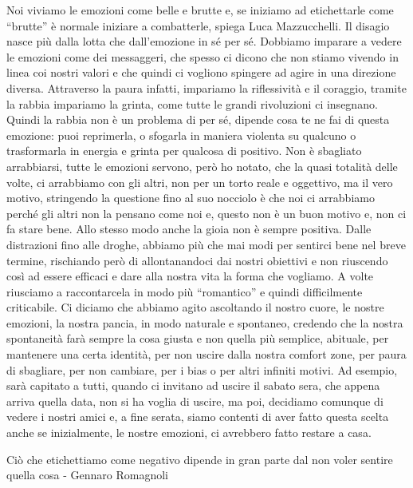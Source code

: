 \documentclass[12pt]{book} %
\begin{document}
Noi viviamo le emozioni come belle e brutte e, se iniziamo ad etichettarle come “brutte” è normale iniziare a
combatterle, spiega Luca Mazzucchelli. Il disagio nasce più dalla lotta che dall'emozione in sé
per sé. Dobbiamo imparare a vedere le emozioni come dei messaggeri, che spesso ci dicono che non stiamo vivendo in
linea coi nostri valori e che quindi ci vogliono spingere ad agire in una direzione diversa. Attraverso la paura
infatti, impariamo la riflessività e il coraggio, tramite la rabbia impariamo la grinta, come tutte le grandi
rivoluzioni ci insegnano. Quindi la rabbia non è un problema di per sé, dipende cosa te ne fai di questa emozione: puoi
reprimerla, o sfogarla in maniera violenta su qualcuno o trasformarla in energia e grinta per qualcosa di positivo.
Non è sbagliato arrabbiarsi, tutte le emozioni servono, però ho notato, che la quasi totalità delle volte, ci arrabbiamo con gli altri, non per un torto reale e oggettivo, ma il vero motivo, stringendo la questione fino al suo nocciolo è che noi ci arrabbiamo perché gli altri non la pensano come noi e, questo non è un buon motivo e, non ci fa stare bene.
Allo stesso modo anche la gioia non è sempre positiva. Dalle distrazioni fino alle droghe, abbiamo più che mai modi per
sentirci bene nel breve termine, rischiando però di allontanandoci dai nostri obiettivi e non riuscendo così ad essere efficaci e
dare alla nostra vita la forma che vogliamo. A volte riusciamo a raccontarcela in modo più “romantico” e quindi
difficilmente criticabile. Ci diciamo che abbiamo agito ascoltando il nostro cuore, le nostre emozioni, la nostra
pancia, in modo naturale e spontaneo, credendo che la nostra spontaneità farà sempre la cosa giusta e non quella più
semplice, abituale, per mantenere una certa identità, per non uscire dalla nostra comfort zone, per paura di sbagliare,
per non cambiare, per i bias o per altri infiniti motivi. Ad esempio, sarà capitato a tutti, quando ci invitano ad
uscire il sabato sera, che appena arriva quella data, non si ha voglia di uscire, ma poi, decidiamo comunque di vedere i
nostri amici e, a fine serata, siamo contenti di aver fatto questa scelta anche se inizialmente, le nostre emozioni, ci avrebbero
fatto restare a casa.

Ciò che etichettiamo come negativo dipende in gran parte dal non voler sentire quella cosa - Gennaro Romagnoli
\end{document}
